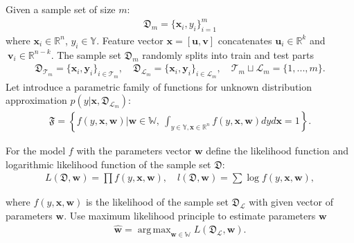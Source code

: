 \documentclass[
11pt,%
tightenlines,%
twoside,%
onecolumn,%
nofloats,%
nobibnotes,%
nofootinbib,%
superscriptaddress,%
noshowpacs,%
centertags]%
{revtex4}
\DeclareMathOperator*{\argmax}{arg\,max}
\begin{document}
Given a sample set of size $m$:
\begin{equation}
\label{eq:ps:1}
\begin{aligned}
	\mathfrak{D}_{m} = \{\textbf{x}_i, y_i\}_{i = 1}^{m}
\end{aligned}
\end{equation}
where $\textbf{x}_i\in \mathbb{R}^{n}$, $y_i\in \mathbb{Y}$. Feature vector $\textbf{x} = [\textbf{u}, \textbf{v}]$ concatenates $\textbf{u}_i\in \mathbb{R}^{k}$ and $~\textbf{v}_i\in \mathbb{R}^{n-k}$.
The sample set $\mathfrak{D}_{m}$ randomly splits into train and test parts
\begin{equation}
\label{eq:ps:2}
\begin{aligned}
	\mathfrak{D}_{\mathcal{T}_{m}} = \{\textbf{x}_i, \textbf{y}_i\}_{i \in \mathcal{T}_{m}}, \quad \mathfrak{D}_{\mathcal{L}_{m}} = \{\textbf{x}_i, \textbf{y}_i\}_{i \in \mathcal{L}_{m}}, \quad  \mathcal{T}_{m}\sqcup\mathcal{L}_{m} = \{1, ..., m\}.
\end{aligned}
\end{equation}
Let introduce a parametric family of functions for unknown distribution approximation $p(y|\textbf{x}, \mathfrak{D}_{\mathcal{L}_{m}})$:
\begin{equation}
\label{eq:ps:3}
\begin{aligned}
	\mathfrak{F} = \left\{f\left(y,\textbf{x}, \textbf{w}\right)|\textbf{w}\in\mathbb{W},~\int_{y\in \mathbb{Y}, \textbf{x}\in\mathbb{R}^{n}}f\left(y, \textbf{x}, \textbf{w}\right)dyd\textbf{x}=1\right\}.
\end{aligned}
\end{equation}

For the model $f$ with the parameters vector $\textbf{w}$ define the likelihood function and logarithmic likelihood function of the sample set $\mathfrak{D}$:
\begin{equation}
\label{eq:ps:4}
\begin{aligned}
	L\left(\mathfrak{D}, \textbf{w}\right) = \prod f\left(y,\textbf{x}, \textbf{w}\right),\quad l\left(\mathfrak{D}, \textbf{w}\right) = \sum \log f\left(y,\textbf{x}, \textbf{w}\right),
\end{aligned}
\end{equation}

where $f(y,\textbf{x}, \textbf{w})$ is the likelihood of the sample set $\mathfrak{D}_{\mathcal{L}}$ with given vector of parameters $\textbf{w}$.
Use maximum likelihood principle to estimate parameters $\textbf{w}$
\begin{equation}
\label{eq:ps:5}
\begin{aligned}
	\hat{\textbf{w}} = \argmax_{\textbf{w}\in\mathbb{W}}L\left(\mathfrak{D}_{\mathcal{L}}, \textbf{w}\right).
\end{aligned}
\end{equation}
\end{document}
